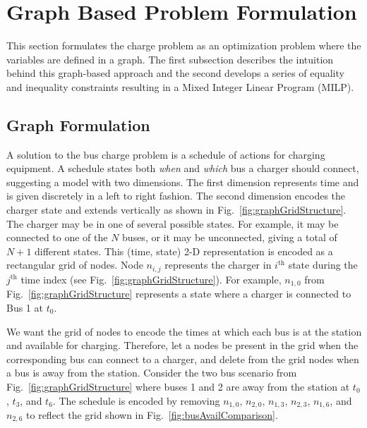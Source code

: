 \section{Graph Based Problem Formulation}
This section formulates the charge problem as an optimization problem where the variables are defined in a graph. The first subsection describes the intuition behind this graph-based approach and the second develops a series of equality and inequality constraints resulting in a Mixed Integer Linear Program (MILP).
\subsection{Graph Formulation}
A solution to the bus charge problem is a schedule of actions for charging equipment.  A schedule states both \textit{when} and \textit{which} bus a charger should connect, suggesting a model with two dimensions. The first dimension represents time and is given discretely in a left to right fashion. The second dimension encodes the charger state and extends vertically as shown in Fig.~\ref{fig:graphGridStructure}.  The charger may be in one of several possible states.  For example, it may be connected to one of the $N$ buses, or it may be unconnected, giving a total of $N + 1$ different states. This (time, state) 2-D representation is encoded as a rectangular grid of nodes.
Node $n_{i,j}$ represents the charger in $i^{\text{th}}$ state during the $j^{\text{th}}$ time index (see Fig.~\ref{fig:graphGridStructure}). For example, $n_{1,0}$ from Fig.~\ref{fig:graphGridStructure} represents a state where a charger is connected to Bus 1 at $t_0$.
\par We want the grid of nodes to encode the times at which each bus is at the station and available for charging.
Therefore, let a nodes be present in the grid when the corresponding bus can connect to a charger, and delete from the grid nodes when a bus is away from the station. Consider the two bus scenario from Fig.~\ref{fig:graphGridStructure} where buses 1 and 2 are away from the station at $t_0$, $t_3$, and $t_6$. The schedule is encoded by removing $n_{1,0}$, $n_{2,0}$, $n_{1,3}$,  $n_{2,3}$, $n_{1,6}$, and $n_{2,6}$ to reflect the grid shown in Fig.~\ref{fig:busAvailComparison}. 
